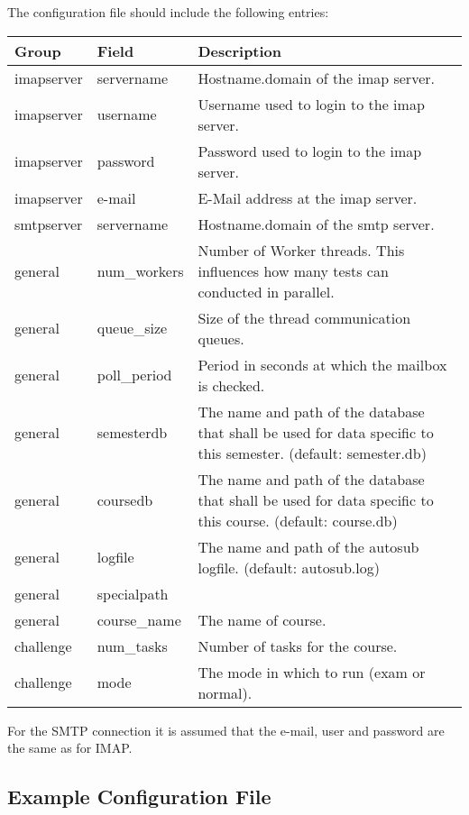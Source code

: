 The configuration file should include the following entries:
\begin{tabular}{|p{4cm}|p{4cm}|p{5cm}|}
\hline

{\bf Group} & {\bf Field} & {\bf Description} \\
\hline
\hline
imapserver & servername & Hostname.domain of the imap server.\\
\hline
imapserver & username & Username used to login to the imap server. \\
\hline
imapserver & password & Password used to login to the imap server. \\
\hline
imapserver & e-mail & E-Mail address at the imap server. \\
\hline
\hline
smtpserver & servername & Hostname.domain of the smtp server.\\
\hline
\hline
general & num\_workers & Number of Worker threads. This influences how many
tests can conducted in parallel. \\
\hline
general & queue\_size & Size of the thread communication queues.\\
\hline
general & poll\_period & Period in seconds at which the mailbox is checked.\\
\hline
general & semesterdb & The name and path of the database that shall be used for data specific to
    this semester. (default: semester.db)\\
\hline
general & coursedb & The name and path of the database that shall be used for data specific to
    this course. (default: course.db)\\
\hline
general & logfile & The name and path of the autosub logfile. (default: autosub.log)\\
\hline
general & specialpath & \\
\hline
general & course\_name & The name of course.\\
\hline
\hline
challenge & num\_tasks & Number of tasks for the course.\\
\hline
challenge & mode & The mode in which to run (exam or normal).\\
\hline
\end{tabular}

For the SMTP connection it is assumed that the e-mail, user and password are the same as for IMAP.


\subsection{Example Configuration File} \label{sub:exampleconfig}

